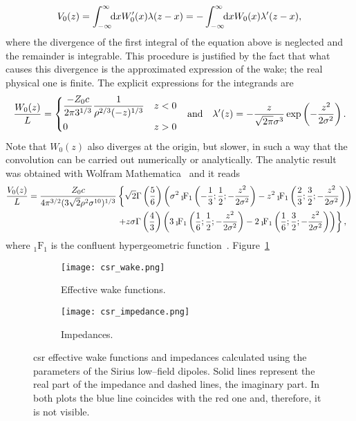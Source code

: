     \begin{align}\label{eq:csr_convolution}
        V_0(z) = \int_{-\infty}^{\infty}\!\!\text{d}x W'_0(x)\lambda(z-x) = -\int_{-\infty}^{\infty}\!\!\text{d}x W_0(x)\lambda'(z-x),
    \end{align}
    where the divergence of the first integral of the equation above is neglected and the remainder is integrable. This procedure is justified by the fact that what causes this divergence is the approximated expression of the wake; the real physical one is finite. The explicit expressions for the integrands are
    \begin{align}
        \frac{W_0(z)}{L} =
        \begin{dcases}
            \frac{-Z_0 c}{2 \pi 3^{1/3}} \frac{1}{\rho^{2/3}(-z)^{1/3}} & z<0\\
            0 & z>0
        \end{dcases}& &\text{and} &&\lambda'(z) = -\frac{z}{\sqrt{2\pi}\sigma^3}\exp\left(-\frac{z^2}{2\sigma^2}\right).
    \end{align}
    Note that $W_0(z)$ also diverges at the origin, but slower, in such a way that the convolution can be carried out numerically or analytically. The analytic result was obtained with Wolfram Mathematica~\cite{WolframResearchInc.2016} and it reads
    \begin{align}\nonumber
        \frac{V_0(z)}{L} =
        \frac{Z_0 c}{4\pi^{3/2}(3\sqrt{2}\rho^2\sigma^{10})^{1/3}}
        &\left\{
            \sqrt{2}\Gamma\left(\frac56\right)
            \left(
                \sigma^2{\,}_{1}\!\text{F}_{1}\left(-\frac13;\frac12;-\frac{z^2}{2\sigma^2}\right) -
                      z^2{\,}_{1}\!\text{F}_{1}\left(\frac23;\frac32;-\frac{z^2}{2\sigma^2}\right)
                \right)\right. \\\nonumber
        &   \left.+ z\sigma\Gamma\left(\frac43\right)
            \left(
                 3{\,}_{1}\!\text{F}_{1}\left(\frac16;\frac12;-\frac{z^2}{2\sigma^2}\right) -
                 2{\,}_{1}\!\text{F}_{1}\left(\frac16;\frac32;-\frac{z^2}{2\sigma^2}\right)\right)\right\},
    \end{align}
    where ${}_1\!\text{F}_1$ is the confluent hypergeometric function~\cite{wiki2017b}.
    Figure~\ref{fig:csr_wake}
    \begin{figure}
        \centering
        \begin{subfigure}[c]{0.48\textwidth}
            \centering
            \texttt{[image: csr\_wake.png]}
            \caption{Effective wake functions.}
            \label{fig:csr_wake}
        \end{subfigure}\hfill
        \begin{subfigure}[c]{0.48\textwidth}
            \centering
            \texttt{[image: csr\_impedance.png]}
            \caption{Impedances.}
            \label{fig:csr_impedance}
        \end{subfigure}
        \caption[CSR effective wake functions and impedances for Sirius low--field dipoles.]{\gls{csr} effective wake functions and impedances calculated using the parameters of the Sirius low--field dipoles. Solid lines represent the real part of the impedance and dashed lines, the imaginary part. In both plots the blue line coincides with the red one and, therefore, it is not visible. }
    \end{figure}
